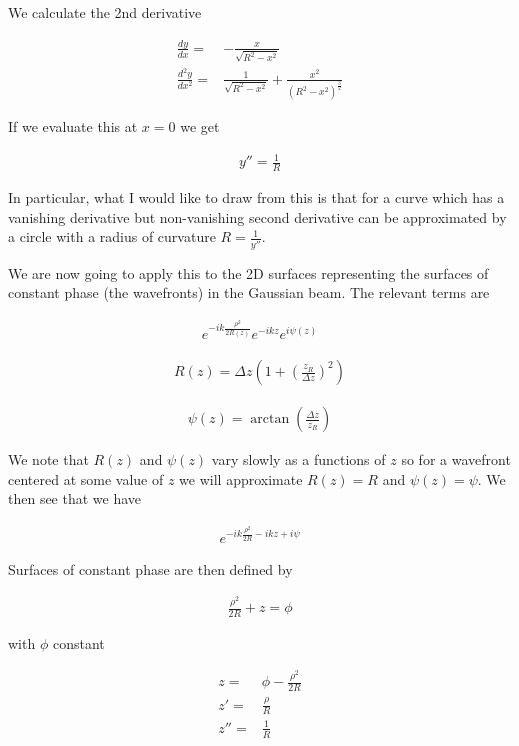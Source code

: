 \documentclass[12pt]{article}
\begin{document}
We calculate the 2nd derivative

\begin{align}
\frac{dy}{dx} =& -\frac{x}{\sqrt{R^2 - x^2}}\\
\frac{d^2y}{dx^2} =& \frac{1}{\sqrt{R^2 - x^2}} + \frac{x^2}{(R^2 - x^2)^{\frac{3}{2}}}
\end{align}

If we evaluate this at $x=0$ we get

\begin{align}
y'' = \frac{1}{R}
\end{align}

In particular, what I would like to draw from this is that for a curve which has a vanishing derivative but non-vanishing second derivative can be approximated by a circle with a radius of curvature $R = \frac{1}{y''}$.

We are now going to apply this to the 2D surfaces representing the surfaces of constant phase (the wavefronts) in the Gaussian beam.
The relevant terms are

\begin{align}
e^{-ik \frac{\rho^2}{2R(z)}} e^{-ikz} e^{i\psi(z)}
\end{align}

\begin{align}
R(z) = \Delta z\left(1+\left(\frac{z_R}{\Delta z}\right)^2\right)
\end{align}

\begin{align}
\psi(z) = \arctan\left(\frac{\Delta z}{z_R}\right)
\end{align}

We note that $R(z)$ and $\psi(z)$ vary slowly as a functions of $z$ so for a wavefront centered at some value of $z$ we will approximate $R(z) = R$ and $\psi(z) = \psi$. We then see that we have

\begin{align}
e^{-ik\frac{\rho^2}{2R} - ikz + i\psi}
\end{align}

Surfaces of constant phase are then defined by

\begin{align}
\frac{\rho^2}{2R} + z = \phi
\end{align}

with $\phi$ constant

\begin{align}
z =& \phi - \frac{\rho^2}{2R}\\
z' =& \frac{\rho}{R}\\
z'' = & \frac{1}{R}
\end{align}
\end{document}
